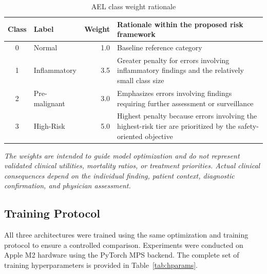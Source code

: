 \documentclass[11pt,a4paper]{article}
\begin{document}
\begin{table}[H]
\centering
\caption{AEL class weight rationale}
\label{tab:ael_weights}
\begin{tabular}{clr p{8.5cm}}
\toprule
\textbf{Class} & \textbf{Label} & \textbf{Weight} &
\textbf{Rationale within the proposed risk framework}\\
\midrule
0 & Normal        & 1.0 & Baseline reference category\\
1 & Inflammatory  & 3.5 & Greater penalty for errors involving inflammatory
                          findings and the relatively small class size\\
2 & Pre-malignant & 3.0 & Emphasizes errors involving findings requiring
                          further assessment or surveillance\\
3 & High-Risk     & 5.0 & Highest penalty because errors involving the
                          highest-risk tier are prioritized by the
                          safety-oriented objective\\
\bottomrule
\end{tabular}
\par\smallskip
{\footnotesize\textit{The weights are intended to guide model optimization
and do not represent validated clinical utilities, mortality ratios, or
treatment priorities. Actual clinical consequences depend on the individual
finding, patient context, diagnostic confirmation, and physician assessment.}}
\end{table}

\subsection{Training Protocol}
\label{sec:training}

All three architectures were trained using the same optimization and training
protocol to ensure a controlled comparison. Experiments were conducted on
Apple M2 hardware using the PyTorch MPS backend. The complete set of training
hyperparameters is provided in Table~\ref{tab:hparams}.
\end{document}
